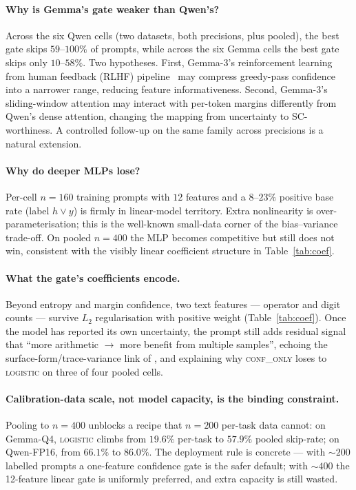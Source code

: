 \documentclass[11pt]{article}
\begin{document}
\paragraph{Why is Gemma's gate weaker than Qwen's?}
Across the six Qwen cells (two datasets, both precisions, plus
pooled), the best gate skips $59$--$100\%$ of prompts, while across
the six Gemma cells the best gate skips only $10$--$58\%$. Two
hypotheses. First, Gemma-3's reinforcement learning from human
feedback (RLHF) pipeline~\citep{Gemma3Report} may compress
greedy-pass confidence into a narrower range, reducing
feature informativeness. Second, Gemma-3's sliding-window attention
may interact with per-token margins differently from Qwen's dense
attention, changing the mapping from uncertainty to SC-worthiness.
A controlled follow-up on the same family across precisions is a
natural extension.

\paragraph{Why do deeper MLPs lose?}
Per-cell $n{=}160$ training prompts with $12$ features and a
$8$--$23\%$ positive base rate (label $h\vee y$) is firmly in
linear-model territory.
Extra nonlinearity is over-parameterisation; this is the well-known
small-data corner of the bias--variance trade-off. On
pooled $n{=}400$ the MLP becomes competitive but still does not
win, consistent with the visibly linear coefficient structure in
Table~\ref{tab:coef}.

\paragraph{What the gate's coefficients encode.}
Beyond entropy and margin confidence, two text features --- operator
and digit counts --- survive $L_2$ regularisation with positive
weight (Table~\ref{tab:coef}). Once the model has reported its own
uncertainty, the prompt still adds residual signal that ``more
arithmetic $\to$ more benefit from multiple samples'', echoing the
surface-form/trace-variance link of
\citet{Lin2024SCAnalysis}, and explaining why \textsc{conf\_only}
loses to \textsc{logistic} on three of four pooled cells.

\paragraph{Calibration-data scale, not model capacity, is the binding constraint.}
Pooling to $n{=}400$ unblocks a recipe that $n{=}200$ per-task data
cannot: on Gemma-Q4, \textsc{logistic} climbs from $19.6\%$
per-task to $57.9\%$ pooled skip-rate; on Qwen-FP16, from $66.1\%$
to $86.0\%$. The deployment rule is concrete --- with $\sim\!200$
labelled prompts a one-feature confidence gate is the safer
default; with $\sim\!400$ the 12-feature linear gate is uniformly
preferred, and extra capacity is still wasted.
\end{document}
